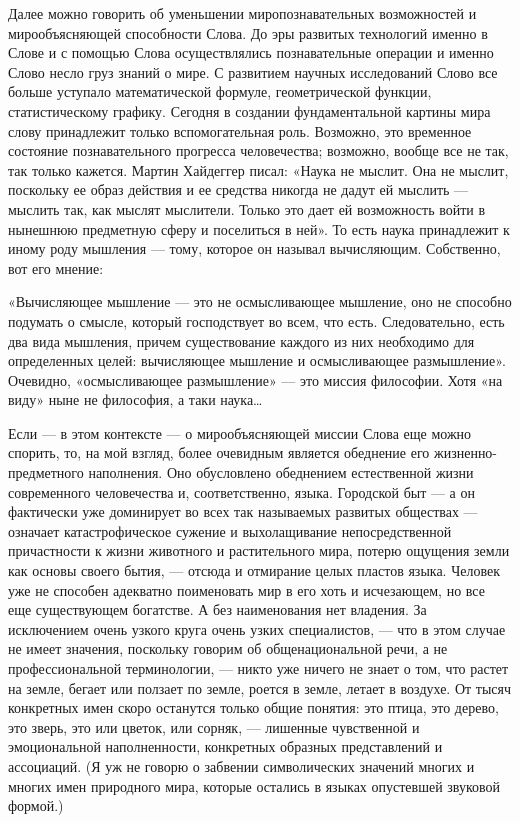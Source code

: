 Далее можно говорить об уменьшении миропознавательных возможностей и
мирообъясняющей способности Слова. До эры развитых технологий именно в Слове и
с помощью Слова осуществлялись познавательные операции и именно Слово несло
груз знаний о мире. С развитием научных исследований Слово все больше уступало
математической формуле, геометрической функции, статистическому графику.
Сегодня в создании фундаментальной картины мира слову принадлежит только
вспомогательная роль. Возможно, это временное состояние познавательного
прогресса человечества; возможно, вообще все не так, так только кажется. Мартин
Хайдеггер писал: «Наука не мыслит. Она не мыслит, поскольку ее образ действия и
ее средства никогда не дадут ей мыслить — мыслить так, как мыслят мыслители.
Только это дает ей возможность войти в нынешнюю предметную сферу и поселиться в
ней». То есть наука принадлежит к иному роду мышления — тому, которое он
называл вычисляющим. Собственно, вот его мнение:

«Вычисляющее мышление — это не осмысливающее мышление, оно не способно подумать
о смысле, который господствует во всем, что есть. Следовательно, есть два вида
мышления, причем существование каждого из них необходимо для определенных
целей: вычисляющее мышление и осмысливающее размышление». Очевидно,
«осмысливающее размышление» — это миссия философии. Хотя «на виду» ныне не
философия, а таки наука…

Если — в этом контексте — о мирообъясняющей миссии Слова еще можно спорить, то,
на мой взгляд, более очевидным является обеднение его жизненно-предметного
наполнения. Оно обусловлено обеднением естественной жизни современного
человечества и, соответственно, языка. Городской быт — а он фактически уже
доминирует во всех так называемых развитых обществах — означает
катастрофическое сужение и выхолащивание непосредственной причастности к жизни
животного и растительного мира, потерю ощущения земли как основы своего бытия,
— отсюда и отмирание целых пластов языка. Человек уже не способен адекватно
поименовать мир в его хоть и исчезающем, но все еще существующем богатстве. А
без наименования нет владения. За исключением очень узкого круга очень узких
специалистов, — что в этом случае не имеет значения, поскольку говорим об
общенациональной речи, а не профессиональной терминологии, — никто уже ничего
не знает о том, что растет на земле, бегает или ползает по земле, роется в
земле, летает в воздухе. От тысяч конкретных имен скоро останутся только общие
понятия: это птица, это дерево, это зверь, это или цветок, или сорняк, —
лишенные чувственной и эмоциональной наполненности, конкретных образных
представлений и ассоциаций. (Я уж не говорю о забвении символических значений
многих и многих имен природного мира, которые остались в языках опустевшей
звуковой формой.)

